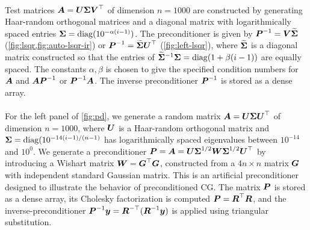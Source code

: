 \documentclass[onefignum,onetabnum,pagebackref,dvipsnames]{siamart220329}
\begin{document}
\paragraph{}
Test matrices $\boldsymbol{A} = \boldsymbol{U}\boldsymbol{\Sigma}\boldsymbol{V}^\top$ of dimension $n=1000$ are constructed by generating Haar-random orthogonal matrices and a diagonal matrix with logarithmically spaced entries $\boldsymbol{\Sigma} = \operatorname{diag}(10^{-\alpha(i-1)})$.
The preconditioner is given by $\boldsymbol{P}^{-1} = \boldsymbol{V}\boldsymbol{\widetilde{\Sigma}}$ (\cref{fig:lsqr,fig:auto-lsqr-ir}) or $\boldsymbol{P}^{-1} = \smash{\boldsymbol{\widetilde{\Sigma}}\boldsymbol{U}^\top}$ (\cref{fig:left-lsqr}), where $\boldsymbol{\widetilde{\Sigma}}$ is a diagonal matrix constructed so that the entries of $\smash{\boldsymbol{\widetilde{\Sigma}}}^{-1}\boldsymbol{\Sigma} = \operatorname{diag}(1 + \beta(i-1))$ are equally spaced.
The constants $\alpha,\beta$ is chosen to give the specified condition numbers for $\boldsymbol{A}$ and $\boldsymbol{A}\boldsymbol{P}^{-1}$ or $\boldsymbol{P}^{-1}\boldsymbol{A}$.
The inverse preconditioner $\boldsymbol{P}^{-1}$ is stored as a dense array.

\paragraph{}
For the left panel of \cref{fig:pd}, we generate a random matrix $\boldsymbol{A} = \boldsymbol{U}\boldsymbol{\Sigma}\boldsymbol{U}^\top$ of dimension $n=1000$, where $\boldsymbol{U}$ is a Haar-random orthogonal matrix and $\boldsymbol{\Sigma} = \operatorname{diag}(10^{-14(i-1)/(n-1)}$ has logarithmically spaced eigenvalues between $10^{-14}$ and $10^0$.
We generate a preconditioner $\boldsymbol{P} = \boldsymbol{A} = \smash{\boldsymbol{U}\boldsymbol{\Sigma}^{1/2}\boldsymbol{W}\boldsymbol{\Sigma}^{1/2}\boldsymbol{U}^\top}$ by introducing a Wishart matrix $\boldsymbol{W} = \boldsymbol{G}^\top\boldsymbol{G}$, constructed from a $4n\times n$ matrix $\boldsymbol{G}$ with independent standard Gaussian matrix.
This is an artificial preconditioner designed to illustrate the behavior of preconditioned CG.
The matrix $\boldsymbol{P}$ is stored as a dense array, its Cholesky factorization is computed $\boldsymbol{P} = \boldsymbol{R}^\top \boldsymbol{R}$, and the inverse-preconditioner $\boldsymbol{P}^{-1}\boldsymbol{y} = \boldsymbol{R}^{-\top}(\boldsymbol{R}^{-1}\boldsymbol{y})$ is applied using triangular substitution.
\end{document}

